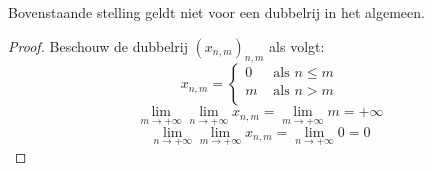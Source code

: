 \documentclass[main.tex]{subfiles}
\begin{document}
\begin{tvb}
  Bovenstaande stelling geldt niet voor een dubbelrij in het algemeen.

  \begin{proof}
    Beschouw de dubbelrij $(x_{n,m})_{n,m}$ als volgt:
    \[
    x_{n,m} = 
    \left\{
      \begin{array}{rl}
        0 & \text{ als } n \le m \\
        m & \text{ als } n > m \\
      \end{array}
    \right.
    \] 
    \[ \lim_{m \rightarrow +\infty}\lim_{n \rightarrow +\infty}x_{n,m} = \lim_{m\rightarrow +\infty}m = +\infty \]
    \[ \lim_{n \rightarrow +\infty}\lim_{m \rightarrow +\infty}x_{n,m} = \lim_{n \rightarrow +\infty}0 = 0 \]
  \end{proof}
\end{tvb}
\end{document}
